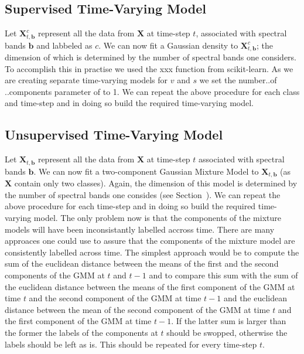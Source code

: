 \documentclass{article}
\begin{document}
\subsection{Supervised Time-Varying Model}
Let $\mathbf{X}_{t,\mathbf{b}}^c$ represent all the data from $\mathbf{X}$ at time-step $t$, associated with spectral bands $\mathbf{b}$ and labbeled as $c$. We can now fit a Gaussian density 
to $\mathbf{X}_{t,\mathbf{b}}^c$; the dimension of which is determined by the number of spectral bands one considers. To accomplish this in practise we used the xxx function from scikit-learn. 
As we are creating separate time-varying models for $v$ and $s$ we set the number..of ..components parameter of to 1. We can repeat the above procedure for each class and time-step and in 
doing so build the required time-varying model.

\subsection{Unsupervised Time-Varying Model}
Let $\mathbf{X}_{t,\mathbf{b}}$ represent all the data from $\mathbf{X}$ at time-step $t$ associated with spectral bands $\mathbf{b}$. We can now fit a two-component Gaussian Mixture Model to $\mathbf{X}_{t,\mathbf{b}}$ (as $\mathbf{X}$ contain only two classes). Again,
the dimension of this model is determined by the number of spectral bands one consides (see Section~). We can repeat the above procedure for each time-step and in doing so 
build the required time-varying model. The only problem now is that the components of the mixture models will have been inconsistantly labelled accross time. There are many approaces one could use to assure 
that the components of the mixture model are consistently labelled across time. The simplest approach would be to compute the sum of the euclidean distance between the means of 
the first and the second components of the GMM at $t$ and $t-1$ and to compare this sum with the sum of the euclidean distance between the means of the first component of the GMM at time $t$ and 
the second component of the GMM at time $t-1$ and the euclidean distance between the mean of the second component of the GMM at time $t$ and the first component of the GMM at time $t-1$. If the latter sum is 
larger than the former the labels of the components at $t$ should be swopped, otherwise the labels should be left as is. This should be repeated for every time-step $t$.
\end{document}
